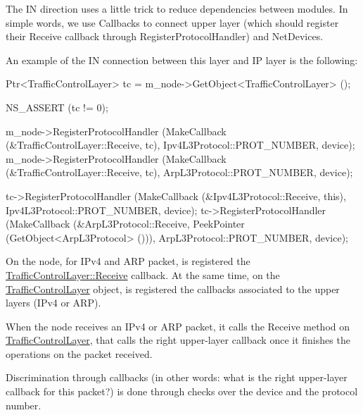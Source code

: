 The IN direction uses a little trick to reduce dependencies between modules. In simple words, we use Callbacks to connect upper layer (which should register their Receive callback through Register\+Protocol\+Handler) and Net\+Devices.

An example of the IN connection between this layer and IP layer is the following\+: \begin{DoxyVerb}Ptr<TrafficControlLayer> tc = m_node->GetObject<TrafficControlLayer> ();

NS_ASSERT (tc != 0);

m_node->RegisterProtocolHandler (MakeCallback (&TrafficControlLayer::Receive, tc),
                                 Ipv4L3Protocol::PROT_NUMBER, device);
m_node->RegisterProtocolHandler (MakeCallback (&TrafficControlLayer::Receive, tc),
                                 ArpL3Protocol::PROT_NUMBER, device);

tc->RegisterProtocolHandler (MakeCallback (&Ipv4L3Protocol::Receive, this),
                             Ipv4L3Protocol::PROT_NUMBER, device);
tc->RegisterProtocolHandler (MakeCallback (&ArpL3Protocol::Receive, PeekPointer (GetObject<ArpL3Protocol> ())),
                             ArpL3Protocol::PROT_NUMBER, device);
\end{DoxyVerb}
 On the node, for I\+Pv4 and A\+RP packet, is registered the \hyperlink{classns3_1_1TrafficControlLayer_ac8d6ccbab480b6b288aa155b8485e178}{Traffic\+Control\+Layer\+::\+Receive} callback. At the same time, on the \hyperlink{classns3_1_1TrafficControlLayer}{Traffic\+Control\+Layer} object, is registered the callbacks associated to the upper layers (I\+Pv4 or A\+RP).

When the node receives an I\+Pv4 or A\+RP packet, it calls the Receive method on \hyperlink{classns3_1_1TrafficControlLayer}{Traffic\+Control\+Layer}, that calls the right upper-\/layer callback once it finishes the operations on the packet received.

Discrimination through callbacks (in other words\+: what is the right upper-\/layer callback for this packet?) is done through checks over the device and the protocol number. 